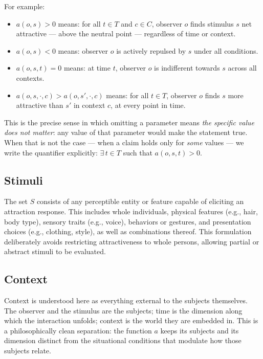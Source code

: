 For example:
\begin{itemize}
  \item $a(o, s) > 0$ means: for all $t \in T$ and $c \in C$, observer $o$ finds stimulus $s$ net attractive --- above the neutral point --- regardless of time or context.
  \item $a(o, s) < 0$ means: observer $o$ is actively repulsed by $s$ under all conditions.
  \item $a(o, s, t) = 0$ means: at time $t$, observer $o$ is indifferent towards $s$ across all contexts.
  \item $a(o, s, \cdot, c) > a(o, s', \cdot, c)$ means: for all $t \in T$, observer $o$ finds $s$ more attractive than $s'$ in context $c$, at every point in time.
\end{itemize}

This is the precise sense in which omitting a parameter means \emph{the specific value does not matter}: any value of that parameter would make the statement true.
When that is not the case --- when a claim holds only for \emph{some} values --- we write the quantifier explicitly: $\exists\, t \in T$ such that $a(o, s, t) > 0$.

\subsection{Stimuli}

The set $S$ consists of any perceptible entity or feature capable of eliciting an attraction response.
This includes whole individuals, physical features (e.g., hair, body type), sensory traits (e.g., voice), behaviors or gestures, and presentation choices (e.g., clothing, style), as well as combinations thereof.
This formulation deliberately avoids restricting attractiveness to whole persons, allowing partial or abstract stimuli to be evaluated.

\subsection{Context}

Context is understood here as everything external to the subjects themselves.
The observer and the stimulus are the subjects; time is the dimension along which the interaction unfolds; context is the world they are embedded in.
This is a philosophically clean separation: the function $a$ keeps its subjects and its dimension distinct from the situational conditions that modulate how those subjects relate.

